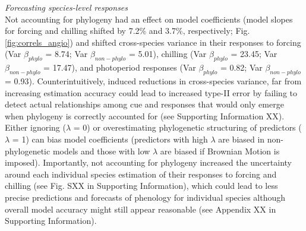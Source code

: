 \documentclass{article}\usepackage[]{graphicx}\usepackage[]{color}
\begin{document}

\emph{Forecasting species-level responses}\\
Not accounting for phylogeny had an effect on model coefficients (model slopes for forcing and chilling shifted by 7.2\% and 3.7\%, respectively; Fig. \ref{fig:correls_angio}) and shifted cross-species variance in their responses to forcing (Var $\beta_{phylo}$ = 8.74; Var $\beta_{non-phylo}$ = 5.01), chilling (Var $\beta_{phylo}$ = 23.45; Var $\beta_{non-phylo}$ = 17.47), and photoperiod responses (Var $\beta_{phylo}$ = 0.82; Var $\beta_{non-phylo}$ = 0.93). Counterintuitively, induced reductions in cross-species variance, far from increasing estimation accuracy could lead to increased type-II error by failing to detect actual relationships among cue and responses that would only emerge when phylogeny is correctly accounted for (see Supporting Information XX). Either ignoring ($\lambda$ = 0) or overestimating phylogenetic structuring of predictors ($\lambda$ = 1) can bias model coefficients (predictors with high $\lambda$ are biased in non-phylogenetic models and those with low $\lambda$ are biased if Brownian Motion is imposed). Importantly, not accounting for phylogeny increased the uncertainty around each individual species estimation of their responses to forcing and chilling (see Fig. SXX in Supporting Information), which could lead to less precise predictions and forecasts of phenology for individual species although overall model accuracy might still appear reasonable (see Appendix XX in Supporting Information).\\
\end{document}
